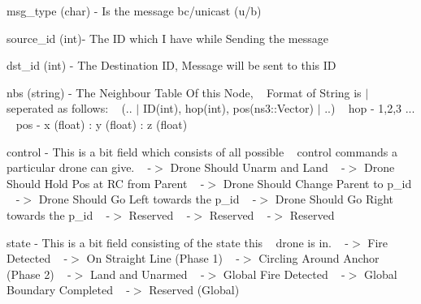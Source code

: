 \begin{DoxyItemize}
\item msg\+\_\+type (char) -\/ Is the message bc/unicast (u/b) ~\newline

\item source\+\_\+id (int)-\/ The ID which I have while Sending the message ~\newline

\item dst\+\_\+id (int) -\/ The Destination ID, Message will be sent to this ID ~\newline

\item nbs (string) -\/ The Neighbour Table Of this Node, ~\newline
 Format of String is $\vert$ seperated as follows\+: ~\newline
 (.. $\vert$ I\+D(int), hop(int), pos(ns3\+::\+Vector) $\vert$ ..) ~\newline
 hop -\/ 1,2,3 ... ~\newline
 pos -\/ x (float) \+: y (float) \+: z (float) ~\newline

\item control -\/ This is a bit field which consists of all possible ~\newline
 control commands a particular drone can give. ~ -\/$>$ Drone Should Unarm and Land ~ -\/$>$ Drone Should Hold Pos at RC from Parent ~ -\/$>$ Drone Should Change Parent to p\+\_\+id ~ -\/$>$ Drone Should Go Left towards the p\+\_\+id ~ -\/$>$ Drone Should Go Right towards the p\+\_\+id ~ -\/$>$ Reserved ~ -\/$>$ Reserved ~ -\/$>$ Reserved ~\newline

\item state -\/ This is a bit field consisting of the state this ~\newline
 drone is in. ~ -\/$>$ Fire Detected ~ -\/$>$ On Straight Line (Phase 1) ~ -\/$>$ Circling Around Anchor (Phase 2) ~ -\/$>$ Land and Unarmed ~ -\/$>$ Global Fire Detected ~ -\/$>$ Global Boundary Completed ~ -\/$>$ Reserved (Global) ~\newline


\end{DoxyItemize}
